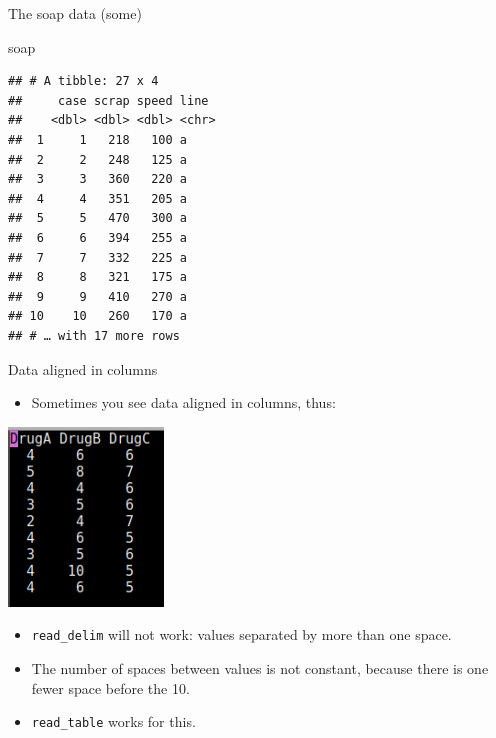\documentclass[
  ignorenonframetext,
]{beamer}
\newenvironment{Shaded}{\begin{snugshade}}{\end{snugshade}}
\newcommand{\NormalTok}[1]{#1}
\providecommand{\tightlist}{%
  \setlength{\itemsep}{0pt}\setlength{\parskip}{0pt}}
\begin{document}
\begin{frame}[fragile]{The soap data (some)}
\protect\hypertarget{the-soap-data-some}{}

\begin{Shaded}
\begin{Highlighting}[]
\NormalTok{soap}
\end{Highlighting}
\end{Shaded}

\begin{verbatim}
## # A tibble: 27 x 4
##     case scrap speed line 
##    <dbl> <dbl> <dbl> <chr>
##  1     1   218   100 a    
##  2     2   248   125 a    
##  3     3   360   220 a    
##  4     4   351   205 a    
##  5     5   470   300 a    
##  6     6   394   255 a    
##  7     7   332   225 a    
##  8     8   321   175 a    
##  9     9   410   270 a    
## 10    10   260   170 a    
## # … with 17 more rows
\end{verbatim}

\end{frame}

\begin{frame}[fragile]{Data aligned in columns}
\protect\hypertarget{data-aligned-in-columns}{}

\begin{itemize}
\tightlist
\item
  Sometimes you see data aligned in columns, thus:
\end{itemize}

\includegraphics[width=\textwidth,height=1.875in]{Screenshot_2019-04-24_20-16-24.png}

\begin{itemize}
\tightlist
\item
  \texttt{read\_delim} will not work: values separated by more than one
  space.
\item
  The number of spaces between values is not constant, because there is
  one fewer space before the 10.
\item
  \texttt{read\_table} works for this.
\end{itemize}

\end{frame}
\end{document}
